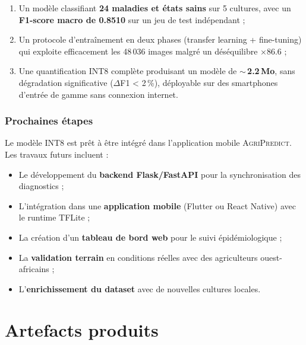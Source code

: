 \documentclass[12pt, a4paper, twoside]{report}
\newcommand{\agri}{\textsc{AgriPredict}}
\begin{document}
\begin{enumerate}
    \item Un modèle classifiant \textbf{24 maladies et états sains} sur 5 cultures, avec un \textbf{F1-score macro de 0.8510} sur un jeu de test indépendant ;
    \item Un protocole d'entraînement en deux phases (transfer learning + fine-tuning) qui exploite efficacement les 48\,036 images malgré un déséquilibre $\times$86.6 ;
    \item Une quantification INT8 complète produisant un modèle de \textbf{$\sim$\,2.2\,Mo}, sans dégradation significative ($\Delta$F1 < 2\,\%), déployable sur des smartphones d'entrée de gamme sans connexion internet.
\end{enumerate}

\subsection*{Prochaines étapes}

Le modèle INT8 est prêt à être intégré dans l'application mobile \agri{}. Les travaux futurs incluent :

\begin{itemize}
    \item Le développement du \textbf{backend Flask/FastAPI} pour la synchronisation des diagnostics ;
    \item L'intégration dans une \textbf{application mobile} (Flutter ou React Native) avec le runtime TFLite ;
    \item La création d'un \textbf{tableau de bord web} pour le suivi épidémiologique ;
    \item La \textbf{validation terrain} en conditions réelles avec des agriculteurs ouest-africains ;
    \item L'\textbf{enrichissement du dataset} avec de nouvelles cultures locales.
\end{itemize}


\chapter*{Artefacts produits}
\end{document}
